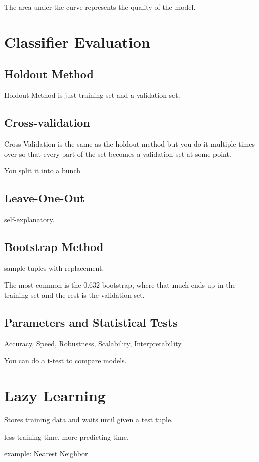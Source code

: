 \documentclass[fleqn]{report}
\begin{document}
The area under the curve represents the quality of the model. 

\section{Classifier Evaluation}

\subsection{Holdout Method}

Holdout Method is just training set and a validation set. 

\subsection{Cross-validation}
Cross-Validation is the same as the holdout method but you do it multiple times 
over so that every part of the set becomes a validation set at some point. 

You split it into a bunch 

\subsection{Leave-One-Out}
self-explanatory.

\subsection{Bootstrap Method}
sample tuples with replacement.

The most common is the 0.632 bootstrap, where that much ends up 
in the training set and the rest is the validation set.

\subsection{Parameters and Statistical Tests}
Accuracy, Speed, Robustness, Scalability, Interpretability.

You can do a t-test to compare models.

\section{Lazy Learning}
Stores training data and waits until given a test tuple. 

less training time, more predicting time.

example: Nearest Neighbor.
\end{document}
